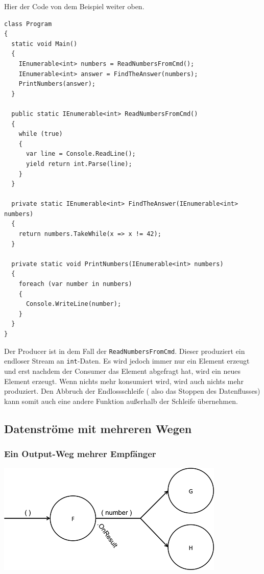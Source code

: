 \documentclass[11pt]{article}
\begin{document}
Hier der Code von dem Beispiel weiter oben.

\begin{verbatim}
class Program
{
  static void Main()
  {
    IEnumerable<int> numbers = ReadNumbersFromCmd();
    IEnumerable<int> answer = FindTheAnswer(numbers);
    PrintNumbers(answer);
  }

  public static IEnumerable<int> ReadNumbersFromCmd()
  {
    while (true)
    {
      var line = Console.ReadLine();
      yield return int.Parse(line);
    }
  }

  private static IEnumerable<int> FindTheAnswer(IEnumerable<int> numbers)
  {
    return numbers.TakeWhile(x => x != 42);
  }

  private static void PrintNumbers(IEnumerable<int> numbers)
  {
    foreach (var number in numbers)
    {
      Console.WriteLine(number);
    }
  }
}
\end{verbatim}

Der Producer ist in dem Fall der \texttt{ReadNumbersFromCmd}.
Dieser produziert ein endloser Stream an \texttt{int}-Daten.
Es wird jedoch immer nur ein Element erzeugt und erst nachdem der Consumer das
Element abgefragt hat, wird ein neues Element erzeugt.
Wenn nichts mehr konsumiert wird, wird auch nichts mehr produziert.
Den Abbruch der Endlossschleife ( also das Stoppen des Datenflusses) kann somit auch eine andere Funktion außerhalb der Schleife
übernehmen.




\subsection{Datenströme mit mehreren Wegen}
\label{sec:orgheadline33}
\subsubsection{Ein Output-Weg mehrer Empfänger}
\label{sec:orgheadline30}
\includegraphics[width=.9\linewidth]{./img/diagramOut1to2.png}
\end{document}
